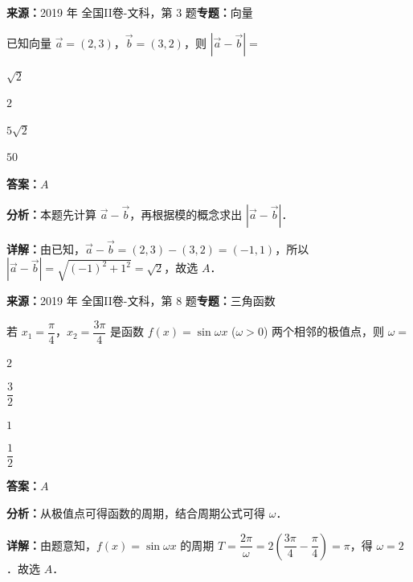 \begin{question}[points=5]
\textbf{来源：}2019 年 全国II卷-文科，第 3 题\quad \textbf{专题：}向量\par
已知向量 $\vec{a}=(2,3)$，$\vec{b}=(3,2)$，则 $|\vec{a}-\vec{b}|=$
\begin{choices}
  \item $\sqrt{2}$
  \item $2$
  \item $5\sqrt{2}$
  \item $50$
\end{choices}
\begin{solution}
\textbf{答案：}$A$

\textbf{分析：}本题先计算 $\vec{a}-\vec{b}$，再根据模的概念求出 $|\vec{a}-\vec{b}|$．

\textbf{详解：}由已知，$\vec{a}-\vec{b}=(2,3)-(3,2)=(-1,1)$，所以 $|\vec{a}-\vec{b}|=\sqrt{(-1)^2+1^2}=\sqrt{2}$，故选 $A$．
\end{solution}
\end{question}

\begin{question}[points=5]
\textbf{来源：}2019 年 全国II卷-文科，第 8 题\quad \textbf{专题：}三角函数\par
若 $x_1=\dfrac{\pi}{4}$，$x_2=\dfrac{3\pi}{4}$ 是函数 $f(x)=\sin\omega x$ ($\omega>0$) 两个相邻的极值点，则 $\omega=$
\begin{choices}
  \item $2$
  \item $\dfrac{3}{2}$
  \item $1$
  \item $\dfrac{1}{2}$
\end{choices}
\begin{solution}
\textbf{答案：}$A$

\textbf{分析：}从极值点可得函数的周期，结合周期公式可得 $\omega$．

\textbf{详解：}由题意知，$f(x)=\sin\omega x$ 的周期 $T=\dfrac{2\pi}{\omega}=2\left(\dfrac{3\pi}{4}-\dfrac{\pi}{4}\right)=\pi$，得 $\omega=2$．故选 $A$．
\end{solution}
\end{question}


